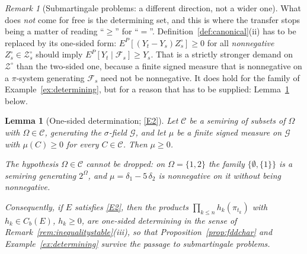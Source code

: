 \documentclass[11pt,a4paper]{article}
\theoremstyle{plain}
\newtheorem{lemma}[theorem]{Lemma}
\theoremstyle{definition}
\theoremstyle{remark}
\newtheorem{remark}[theorem]{Remark}
\newcommand{\Cb}{C_b}                          %
\newcommand{\Filt}{\mathcal{F}}
\newcommand{\Gilt}{\mathcal{G}}
\newcommand{\ZZ}{\mathcal{Z}}                  %
\begin{document}
\begin{remark}[Submartingale problems: a different direction, not a wider one]
  What does \emph{not} come for free is the determining set, and this is where
  the transfer stops being a matter of reading ``$\geq$'' for ``$=$''.
  Definition~\ref{def:canonical}(ii) has to be replaced by its one-sided form:
  $E^P[(Y_t - Y_s)Z^\circ_s] \geq 0$ for all \emph{nonnegative}
  $Z^\circ_s \in \ZZ^\circ_s$ should imply $E^P[Y_t \mid \Filt_s] \geq Y_s$.  That
  is a strictly stronger demand on $\ZZ^\circ$ than the two-sided one, because a
  finite signed measure that is nonnegative on a $\pi$-system generating
  $\Filt_s$ need not be nonnegative.  It does hold for the family of
  Example~\ref{ex:determining}, but for a reason that has to be supplied:
  Lemma~\ref{lem:semiring} below.
\end{remark}

\begin{lemma}[One-sided determination; \eqref{E2}]
  \label{lem:semiring}
  Let $\mathcal{C}$ be a semiring of subsets of $\Omega$ with
  $\Omega \in \mathcal{C}$, generating the
  $\sigma$-field $\Gilt$, and let $\mu$ be a finite signed measure on $\Gilt$ with
  $\mu(C) \geq 0$ for every $C \in \mathcal{C}$.  Then $\mu \geq 0$.

  The hypothesis $\Omega \in \mathcal{C}$ cannot be dropped: on
  $\Omega = \{1,2\}$ the family $\{\emptyset,\{1\}\}$ is a semiring generating
  $2^\Omega$, and $\mu = \delta_1 - 5\,\delta_2$ is nonnegative on it without
  being nonnegative.

  Consequently, if $E$ satisfies \eqref{E2}, then the products
  $\prod_{k \leq n} h_k(\pi_{t_k})$ with $h_k \in \Cb(E)$, $h_k \geq 0$, are
  one-sided determining in the sense of
  Remark~\ref{rem:inequalitystable}(iii), so that
  Proposition~\ref{prop:fddchar} and Example~\ref{ex:determining} survive the
  passage to submartingale problems.
\end{lemma}
\end{document}
